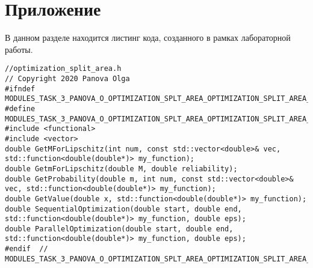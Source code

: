 \documentclass{report}
\begin{document}
\section*{Приложение}
В данном разделе находится листинг кода, созданного в рамках лабораторной работы. \par
\begin{lstlisting}
//optimization_split_area.h
// Copyright 2020 Panova Olga
#ifndef MODULES_TASK_3_PANOVA_O_OPTIMIZATION_SPLT_AREA_OPTIMIZATION_SPLIT_AREA_H_
#define MODULES_TASK_3_PANOVA_O_OPTIMIZATION_SPLT_AREA_OPTIMIZATION_SPLIT_AREA_H_
#include <functional>
#include <vector>
double GetMForLipschitz(int num, const std::vector<double>& vec, std::function<double(double*)> my_function);
double GetmForLipschitz(double M, double reliability);
double GetProbability(double m, int num, const std::vector<double>& vec, std::function<double(double*)> my_function);
double GetValue(double x, std::function<double(double*)> my_function);
double SequentialOptimization(double start, double end, std::function<double(double*)> my_function, double eps);
double ParallelOptimization(double start, double end, std::function<double(double*)> my_function, double eps);
#endif  // MODULES_TASK_3_PANOVA_O_OPTIMIZATION_SPLT_AREA_OPTIMIZATION_SPLIT_AREA_H_
\end{lstlisting}
\end{document}
